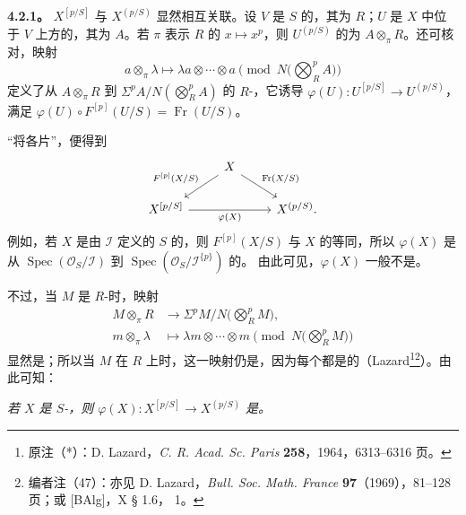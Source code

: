 \textbf{4.2.1。} $X^{[p/S]}$ 与 $X^{(p/S)}$ 显然相互关联。设 $V$ 是 $S$ 的，其为 $R$；$U$ 是 $X$ 中位于 $V$ 上方的，其为 $A$。若 $\pi$ 表示 $R$ 的 $x\mapsto x^p$，则 $U^{(p/S)}$ 的为 $A\otimes_\pi R$。还可核对，映射
\[
a\otimes_\pi\lambda\longmapsto
\lambda a\otimes\cdots\otimes a\pmod{N\bigl(\bigotimes_R^p A\bigr)}
\]
定义了从 $A\otimes_\pi R$ 到 $\Sigma^p A/N(\bigotimes_R^p A)$ 的 $R$-，它诱导 $\varphi(U):U^{[p/S]}\to U^{(p/S)}$，满足 $\varphi(U)\circ F^{[p]}(U/S)=\operatorname{Fr}(U/S)$。

“将各片”，便得到
\[
\begin{tikzcd}
&X\arrow[dl,"{F^{[p]}(X/S)}"']\arrow[dr,"\operatorname{Fr}(X/S)"]&\\
X^{[p/S]}\arrow[rr,"\varphi(X)"']&&X^{(p/S)}.
\end{tikzcd}
\]
例如，若 $X$ 是由 $\mathcal I$ 定义的 $S$ 的，则 $F^{[p]}(X/S)$ 与 $X$ 的等同，所以 $\varphi(X)$ 是从 $\operatorname{Spec}(\mathcal O_S/\mathcal I)$ 到 $\operatorname{Spec}(\mathcal O_S/\mathcal I^{\{p\}})$ 的。
由此可见，$\varphi(X)$ 一般不是。

不过，当 $M$ 是 $R$-时，映射
\[
\begin{aligned}
M\otimes_\pi R&\longrightarrow\Sigma^p M/N\bigl(\bigotimes_R^p M\bigr),\\
m\otimes_\pi\lambda&\longmapsto\lambda m\otimes\cdots\otimes m\pmod{N\bigl(\bigotimes_R^p M\bigr)}
\end{aligned}
\]
显然是；所以当 $M$ 在 $R$ 上时，这一映射仍是，因为每个都是的（Lazard\footnote{原注（*）：D. Lazard，\emph{C. R. Acad. Sc. Paris} \textbf{258}，1964，6313–6316 页。}\footnote{编者注（47）：亦见 D. Lazard，\emph{Bull. Soc. Math. France} \textbf{97}（1969），81–128 页；或 [BAlg]，X § 1.6， 1。}）。由此可知：

\emph{若 $X$ 是 $S$-，则 $\varphi(X):X^{[p/S]}\to X^{(p/S)}$ 是。}

